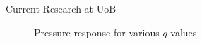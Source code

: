 \documentclass[aspectratio=169]{beamer}            %
\begin{document}
\begin{frame}{Current Research at UoB}

  \begin{figure}[!htb]
    \centering
		
		\caption{Pressure response for various ${q}$ values}
		\label{fig:PressureResponse2q}
  \end{figure}

\end{frame}

\end{document}
